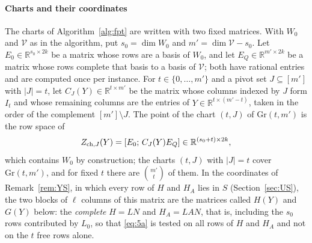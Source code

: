\documentclass[journal]{IEEEtran}
\theoremstyle{plainn}
\theoremstyle{remark}
\begin{document}
\paragraph*{Charts and their coordinates}\label{sec:chartcoords}
The charts of Algorithm~\ref{alg:fpt} are written with two fixed matrices. With $W_0$ and
$\mathcal V$ as in the algorithm, put $s_0=\dim W_0$ and $m'=\dim\mathcal V-s_0$. Let
$E_0\in\mathbb R^{s_0\times2k}$ be a matrix whose rows are a basis of $W_0$, and let
$E_Q\in\mathbb R^{m'\times2k}$ be a matrix whose rows complete that basis to a basis of $\mathcal V$;
both have rational entries and are computed once per instance. For $t\in\{0,\dots,m'\}$ and a pivot
set $J\subseteq[m']$ with $|J|=t$, let $C_J(Y)\in\mathbb R^{t\times m'}$ be the matrix whose columns
indexed by $J$ form $I_t$ and whose remaining columns are the entries of $Y\in\mathbb R^{t\times(m'-t)}$,
taken in the order of the complement $[m']\setminus J$. The point of the chart $(t,J)$ of
$\mathrm{Gr}(t,m')$ is the row space of
\begin{equation*}
Z_{{\rm ch},J}(Y)=[E_0;\,C_J(Y)E_Q]\in\mathbb R^{(s_0+t)\times2k},
\end{equation*}
which contains $W_0$ by construction; the charts $(t,J)$ with $|J|=t$ cover $\mathrm{Gr}(t,m')$, and for
fixed $t$ there are $\binom{m'}{t}$ of them. In the coordinates of Remark~\ref{rem:YS}, in which every row
of $H$ and $H_A$ lies in $S$ (Section~\ref{sec:US}), the two blocks of $\ell$ columns of this matrix
are the matrices called $H(Y)$ and $G(Y)$ below: the \emph{complete} $H=LN$ and $H_A=LAN$, that is,
including the $s_0$ rows contributed by $L_0$, so that \eqref{eq:5a} is tested on all rows of $H$ and
$H_A$ and not on the $t$ free rows alone.
\end{document}
